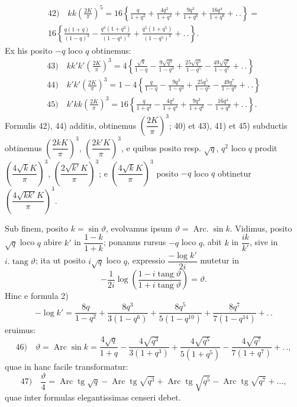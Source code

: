 \documentclass{article}
\begin{document}
\[
\begin{gathered}
\text{42)}\quad kk\left(\frac{2K}{\pi}\right)^{5}=16\left\{\frac{q}{1+q^{2}}+\frac{4q^{2}}{1+q^{4}}+\frac{9q^{3}}{1+q^{6}}+\frac{16q^{4}}{1+q^{8}}+.\,.\right\}=\\[2ex]
16\left\{\frac{q(1+q)}{(1-q)^{3}}-\frac{q^{3}(1+q^{3})}{(1-q^{3})^{3}}+\frac{q^{5}(1+q^{5})}{(1-q^{5})^{3}}+.\,.\right\}.
\end{gathered}
\]
Ex his posito $-q$ loco $q$ obtinemus:
\[
\begin{gathered}
\text{43)}\quad kk'k'\left(\frac{2K}{\pi}\right)^{3}=4\left\{\frac{\sqrt{q}}{1-q}-\frac{9\sqrt{q^{3}}}{1-q^{3}}+\frac{25\sqrt{q^{5}}}{1-q^{5}}-\frac{49\sqrt{q^{7}}}{1-q^{7}}+.\,.\right\}\\[2ex]
\text{44)}\quad k'k'\left(\frac{2K}{\pi}\right)^{3}=1-4\left\{\frac{q}{1-q}-\frac{9q^{3}}{1-q^{3}}+\frac{25q^{5}}{1-q^{5}}-\frac{49q^{7}}{1-q^{7}}+.\,.\right\}\\[2ex]
\text{45)}\quad k'kk\left(\frac{2K}{\pi}\right)^{3}=16\left\{\frac{q}{1+q^{2}}-\frac{4q^{2}}{1+q^{4}}+\frac{9q^{3}}{1+q^{6}}-\frac{16q^{4}}{1+q^{8}}+.\,.\right\}.
\end{gathered}
\]
Formulis 42), 44) additis, obtinemus $\left(\dfrac{2K}{\pi}\right)^{3}$; 40) et 43), 41) et 45) subductis obtinemus $\left(\dfrac{2kK}{\pi}\right)^{3}$, $\left(\dfrac{2k'K}{\pi}\right)^{3}$, e quibus posito resp. $\sqrt{q}$, $q^{2}$ loco $q$ prodit $\left(\dfrac{4\sqrt{k}K}{\pi}\right)^{3}$, $\left(\dfrac{2\sqrt{k'}K}{\pi}\right)^{3}$; e $\left(\dfrac{4\sqrt{k}K}{\pi}\right)^{3}$ posito $-q$ loco $q$ obtinetur $\left(\dfrac{4\sqrt{kk'}K}{\pi}\right)^{3}$.

Sub finem, posito $k=\sin\vartheta$, evolvamus ipsum $\vartheta=\operatorname{Arc.}\sin k$. Vidimus, posito $\sqrt{q}$ loco $q$ abire $k'$ in $\dfrac{1-k}{1+k}$; ponamus rursus $-q$ loco $q$, abit $k$ in $\dfrac{ik}{k'}$, sive in $i.\operatorname{tang}\vartheta$; ita ut posito $i\sqrt{q}$ loco $q$, expressio $\dfrac{-\log k'}{2i}$ mutetur in
\[
-\frac{1}{2i}\log\left(\frac{1-i\operatorname{tang}\vartheta}{1+i\operatorname{tang}\vartheta}\right)=\vartheta.
\]
Hinc e formula 2)
\[
-\log k'=\frac{8q}{1-q^{2}}+\frac{8q^{3}}{3(1-q^{6})}+\frac{8q^{5}}{5(1-q^{10})}+\frac{8q^{7}}{7(1-q^{14})}+.\,.
\]
eruimus:
\[
\text{46)}\quad\vartheta=\operatorname{Arc}\sin k=\frac{4\sqrt{q}}{1+q}-\frac{4\sqrt{q^{3}}}{3(1+q^{3})}+\frac{4\sqrt{q^{5}}}{5(1+q^{5})}-\frac{4\sqrt{q^{7}}}{7(1+q^{7})}+.\,.,
\]
quae in hanc facile transformatur:
\[
\text{47)}\quad\frac{\vartheta}{4}=\operatorname{Arc}\operatorname{tg}\sqrt{q}-\operatorname{Arc}\operatorname{tg}\sqrt{q^{3}}+\operatorname{Arc}\operatorname{tg}\sqrt{q^{5}}-\operatorname{Arc}\operatorname{tg}\sqrt{q^{7}}+\ldots,
\]
quae inter formulas elegantissimas censeri debet.
\end{document}
